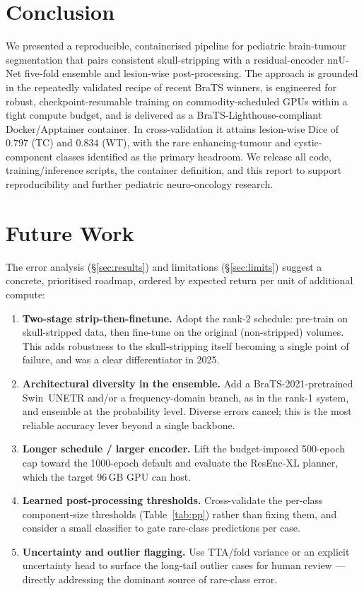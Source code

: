 \documentclass[11pt,a4paper]{article}
\begin{document}
\section{Conclusion}
\label{sec:conclusion}
We presented a reproducible, containerised pipeline for pediatric brain-tumour
segmentation that pairs consistent skull-stripping with a residual-encoder nnU-Net
five-fold ensemble and lesion-wise post-processing. The approach is grounded in the
repeatedly validated recipe of recent BraTS winners, is engineered for robust,
checkpoint-resumable training on commodity-scheduled GPUs within a tight compute
budget, and is delivered as a BraTS-Lighthouse-compliant Docker/Apptainer container.
In cross-validation it attains lesion-wise Dice of $0.797$ (TC) and $0.834$ (WT),
with the rare enhancing-tumour and cystic-component classes identified as the primary
headroom. We release all code, training/inference scripts, the container definition,
and this report to support reproducibility and further pediatric neuro-oncology
research.

\section{Future Work}
\label{sec:future}
The error analysis (\S\ref{sec:results}) and limitations (\S\ref{sec:limits})
suggest a concrete, prioritised roadmap, ordered by expected return per unit of
additional compute:
\begin{enumerate}[leftmargin=1.6em,itemsep=2pt]
  \item \textbf{Two-stage strip-then-finetune.} Adopt the rank-2 schedule: pre-train
        on skull-stripped data, then fine-tune on the original (non-stripped) volumes.
        This adds robustness to the skull-stripping itself becoming a single point of
        failure, and was a clear differentiator in 2025.
  \item \textbf{Architectural diversity in the ensemble.} Add a BraTS-2021-pretrained
        Swin~UNETR and/or a frequency-domain branch, as in the rank-1 system, and
        ensemble at the probability level. Diverse errors cancel; this is the most
        reliable accuracy lever beyond a single backbone.
  \item \textbf{Longer schedule / larger encoder.} Lift the budget-imposed 500-epoch
        cap toward the 1000-epoch default and evaluate the ResEnc-XL planner, which
        the target 96\,GB GPU can host.
  \item \textbf{Learned post-processing thresholds.} Cross-validate the per-class
        component-size thresholds (Table~\ref{tab:pp}) rather than fixing them, and
        consider a small classifier to gate rare-class predictions per case.
  \item \textbf{Uncertainty and outlier flagging.} Use TTA/fold variance or an
        explicit uncertainty head to surface the long-tail outlier cases for human
        review --- directly addressing the dominant source of rare-class error.
\end{enumerate}
\end{document}

